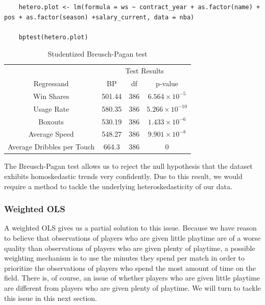 \documentclass[12pt]{article}
\begin{document}
	
	\begin{lstlisting}
	hetero.plot <- lm(formula = ws ~ contract_year + as.factor(name) + pos + as.factor(season) +salary_current, data = nba)
	
	bptest(hetero.plot)
	\end{lstlisting}
	
	\begin{table}[H]
		\centering
		\caption{Studentized Breusch-Pagan test}
		\begin{tabular}{*4c}
			\toprule
			& \multicolumn{3}{c}{Test Results} \\
			\cmidrule(lr){2-4}
			Regressand & BP  & df & p-value \\
			\midrule
			Win Shares & 501.44       & 386 & $6.564\times 10^{-5}$       \\
			Usage Rate & 580.35       & 386       & $5.266\times10^{-10}$ \\
			Boxouts & 530.19       & 386 & $1.433\times10^{-6}$ \\
			Average Speed & 548.27 & 386       & $9.901\times 10^{-8}$       \\
			Average Dribbles per Touch & 664.3  & 386 & $0$        \\
			\bottomrule
		\end{tabular}
	\end{table}
	
	The Breusch-Pagan test allows us to reject the null hypothesis that the dataset exhibits homoskedastic trends very confidently. Due to this result, we would require a method to tackle the underlying heteroskedasticity of our data.
	
	\subsubsection{Weighted OLS}
	
	A weighted OLS gives us a partial solution to this issue. Because we have reason to believe that observations of players who are given little playtime are of a worse quality than observations of players who are given plenty of playtime, a possible weighting mechanism is to use the minutes they spend per match in order to prioritize the observations of players who spend the most amount of time on the field. There is, of course, an issue of whether players who are given little playtime are different from players who are given plenty of playtime. We will turn to tackle this issue in this next section.
	
\end{document}
